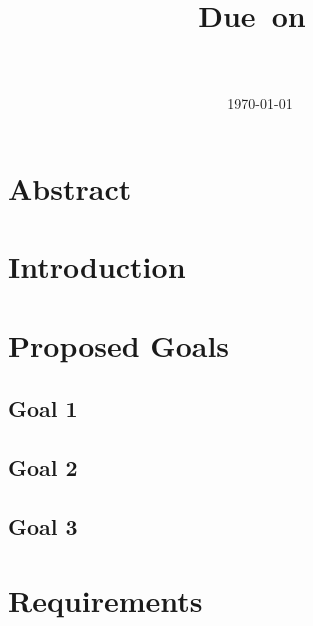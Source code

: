 \documentclass[fleqn]{article}
\title{
	\vspace{2in}
	\textmd{\textbf{\hmwkClass\ \hmwkTitle}}\\
	\normalsize\vspace{0.1in}Due\ on\ \hmwkDueDate\\
	\large{\hmwkClassInstructor}\\
	\vspace{3in}
}
\author{\textbf{\hmwkAuthorName}}
\date{\today} %
\begin{document}
	\maketitle


\newpage
\tableofcontents
\newpage
\section{Abstract}

\section{Introduction}



\section{Proposed Goals}
\subsection{Goal 1}
\subsection{Goal 2}
\subsection{Goal 3}


\section{Requirements}
\end{document}
